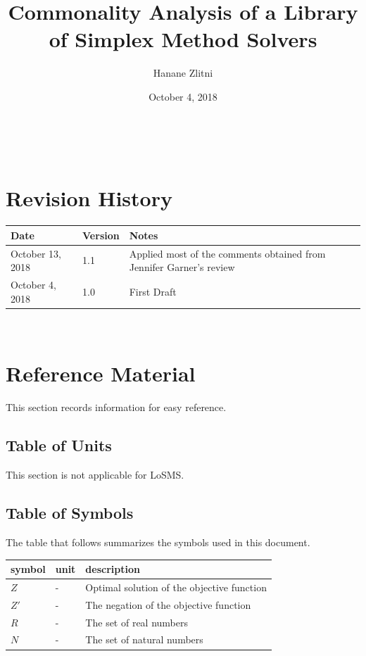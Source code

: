 \documentclass[12pt]{article}
\newcommand{\famname}{LoSMS} %
\begin{document}
\title{Commonality Analysis of a Library of Simplex Method Solvers } 
\author{Hanane Zlitni}
\date{October 4, 2018}

\maketitle

~\newpage


\section{Revision History}

\begin{tabularx}{\textwidth}{p{3cm}p{2cm}X}
	\toprule {\bf Date} & {\bf Version} & {\bf Notes}\\
	\midrule
	October 13, 2018 & 1.1 & Applied most of the comments obtained from 
	Jennifer Garner's review\\
	October 4, 2018 & 1.0 & First Draft\\
	\bottomrule
\end{tabularx}

~\newpage
	
\section{Reference Material}

This section records information for easy reference.

\subsection{Table of Units}

This section is not applicable for \famname{}.

\subsection{Table of Symbols}

The table that follows summarizes the symbols used in this document.

\renewcommand{\arraystretch}{1.2}
\noindent \begin{longtable*}{l l p{12cm}} \toprule
\textbf{symbol} & \textbf{unit} & \textbf{description}\\
\midrule 
	$Z$ & - & Optimal solution of the objective function\\
	$Z'$ & - & The negation of the objective function\\
	$R$ & - & The set of real numbers\\
	$N$ & - & The set of natural numbers\\
\bottomrule
\end{longtable*}
\end{document}
